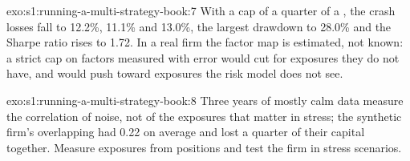 \begin{solution}{exo:s1:running-a-multi-strategy-book:7}
With a cap of a quarter of a , the crash losses fall to 12.2\%, 11.1\% and 13.0\%, the largest drawdown to 28.0\% and the Sharpe ratio rises to 1.72.
In a real firm the factor map is estimated, not known: a strict cap on factors measured with error would cut  for exposures they do not have, and
would push  toward exposures the risk model does not see.
\end{solution}

\begin{solution}{exo:s1:running-a-multi-strategy-book:8}
Three years of mostly calm data measure the correlation of noise, not of the exposures that matter in stress; the synthetic firm's overlapping  had
0.22 on average and lost a quarter of their capital together. Measure exposures from positions and test the firm in stress scenarios.
\end{solution}

